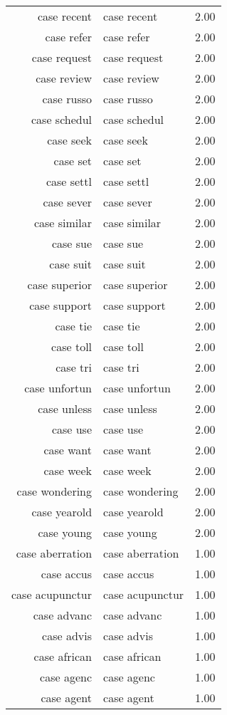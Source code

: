 \begin{table}[ht]
\begin{tabular}{rlr}
  case recent & case recent & 2.00 \\ 
  case refer & case refer & 2.00 \\ 
  case request & case request & 2.00 \\ 
  case review & case review & 2.00 \\ 
  case russo & case russo & 2.00 \\ 
  case schedul & case schedul & 2.00 \\ 
  case seek & case seek & 2.00 \\ 
  case set & case set & 2.00 \\ 
  case settl & case settl & 2.00 \\ 
  case sever & case sever & 2.00 \\ 
  case similar & case similar & 2.00 \\ 
  case sue & case sue & 2.00 \\ 
  case suit & case suit & 2.00 \\ 
  case superior & case superior & 2.00 \\ 
  case support & case support & 2.00 \\ 
  case tie & case tie & 2.00 \\ 
  case toll & case toll & 2.00 \\ 
  case tri & case tri & 2.00 \\ 
  case unfortun & case unfortun & 2.00 \\ 
  case unless & case unless & 2.00 \\ 
  case use & case use & 2.00 \\ 
  case want & case want & 2.00 \\ 
  case week & case week & 2.00 \\ 
  case wondering & case wondering & 2.00 \\ 
  case yearold & case yearold & 2.00 \\ 
  case young & case young & 2.00 \\ 
  case aberration & case aberration & 1.00 \\ 
  case accus & case accus & 1.00 \\ 
  case acupunctur & case acupunctur & 1.00 \\ 
  case advanc & case advanc & 1.00 \\ 
  case advis & case advis & 1.00 \\ 
  case african & case african & 1.00 \\ 
  case agenc & case agenc & 1.00 \\ 
  case agent & case agent & 1.00 \\ 

\end{tabular}
\end{table}
